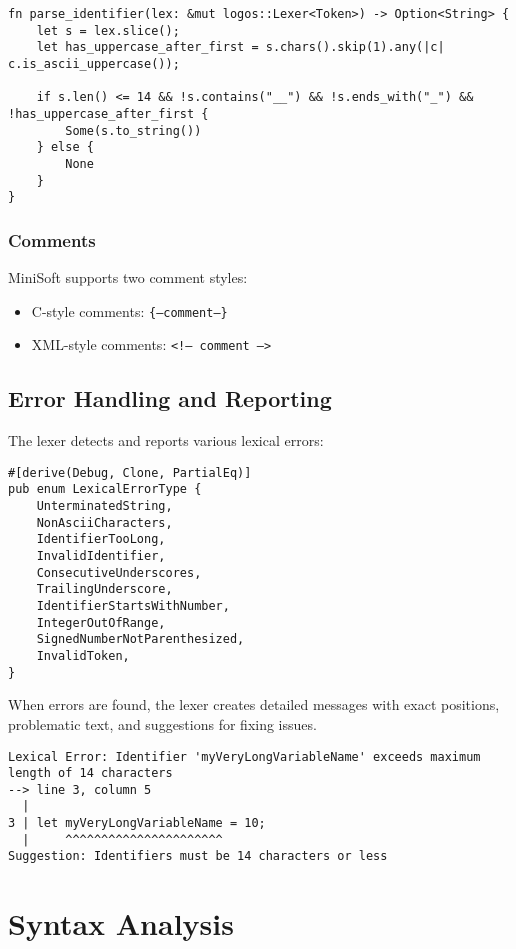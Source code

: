 \documentclass[12pt,a4paper]{article}
\begin{document}
\begin{lstlisting}[caption={Identifier Validation}]
fn parse_identifier(lex: &mut logos::Lexer<Token>) -> Option<String> {
    let s = lex.slice();
    let has_uppercase_after_first = s.chars().skip(1).any(|c| c.is_ascii_uppercase());

    if s.len() <= 14 && !s.contains("__") && !s.ends_with("_") && !has_uppercase_after_first {
        Some(s.to_string())
    } else {
        None
    }
}
\end{lstlisting}

\subsubsection{Comments}
MiniSoft supports two comment styles:
\begin{itemize}
	\item C-style comments: \texttt{\{--comment--\}}
	\item XML-style comments: \texttt{<!-- comment -->}
\end{itemize}

\subsection{Error Handling and Reporting}
The lexer detects and reports various lexical errors:

\begin{lstlisting}[caption={Lexical Error Types}]
#[derive(Debug, Clone, PartialEq)]
pub enum LexicalErrorType {
    UnterminatedString,
    NonAsciiCharacters,
    IdentifierTooLong,
    InvalidIdentifier,
    ConsecutiveUnderscores,
    TrailingUnderscore,
    IdentifierStartsWithNumber,
    IntegerOutOfRange,
    SignedNumberNotParenthesized,
    InvalidToken,
}
\end{lstlisting}

When errors are found, the lexer creates detailed messages with exact positions, problematic text, and suggestions for fixing issues.

\begin{lstlisting}[caption={Sample Error Output}]
Lexical Error: Identifier 'myVeryLongVariableName' exceeds maximum length of 14 characters
--> line 3, column 5
  |
3 | let myVeryLongVariableName = 10;
  |     ^^^^^^^^^^^^^^^^^^^^^^ 
Suggestion: Identifiers must be 14 characters or less
\end{lstlisting}

\section{Syntax Analysis}
\end{document}
